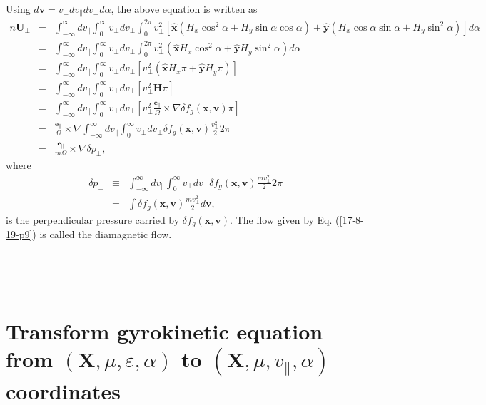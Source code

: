 \documentclass{article}
\begin{document}
Using $d\mathbf{v}= v_{\perp} d v_{\parallel} d v_{\perp} d \alpha$, the above
equation is written as
\begin{eqnarray}
  n\mathbf{U}_{\perp} & = & \int_{- \infty}^{\infty} d v_{\parallel}
  \int_0^{\infty} v_{\perp} d v_{\perp} \int_0^{2 \pi} v_{\perp}^2
  [\hat{\mathbf{x}} (H_x \cos^2 \alpha + H_y \sin \alpha \cos \alpha) +
  \hat{\mathbf{y}} (H_x \cos \alpha \sin \alpha + H_y \sin^2 \alpha)] d \alpha
  \nonumber\\
  & = & \int_{- \infty}^{\infty} d v_{\parallel} \int_0^{\infty} v_{\perp} d
  v_{\perp} \int_0^{2 \pi} v_{\perp}^2 (\hat{\mathbf{x}} H_x \cos^2 \alpha +
  \hat{\mathbf{y}} H_y \sin^2 \alpha) d \alpha \nonumber\\
  & = & \int_{- \infty}^{\infty} d v_{\parallel} \int_0^{\infty} v_{\perp} d
  v_{\perp} [v_{\perp}^2 (\hat{\mathbf{x}} H_x \pi + \hat{\mathbf{y}} H_y
  \pi)] \nonumber\\
  & = & \int_{- \infty}^{\infty} d v_{\parallel} \int_0^{\infty} v_{\perp} d
  v_{\perp} [v_{\perp}^2 \mathbf{H} \pi] \nonumber\\
  & = & \int_{- \infty}^{\infty} d v_{\parallel} \int_0^{\infty} v_{\perp} d
  v_{\perp} [v_{\perp}^2 \frac{\mathbf{e}_{\parallel}}{\Omega} \times \nabla
  \delta f_g (\mathbf{x}, \mathbf{v}) \pi] \nonumber\\
  & = & \frac{\mathbf{e}_{\parallel}}{\Omega} \times \nabla \int_{-
  \infty}^{\infty} d v_{\parallel} \int_0^{\infty} v_{\perp} d v_{\perp}
  \delta f_g (\mathbf{x}, \mathbf{v}) \frac{v_{\perp}^2}{2} 2 \pi \nonumber\\
  & = & \frac{\mathbf{e}_{\parallel}}{m \Omega} \times \nabla \delta
  p_{\perp},  \label{17-8-19-p9}
\end{eqnarray}
where
\begin{eqnarray}
  \delta p_{\perp} & \equiv & \int_{- \infty}^{\infty} d v_{\parallel}
  \int_0^{\infty} v_{\perp} d v_{\perp} \delta f_g (\mathbf{x}, \mathbf{v})
  \frac{m v_{\perp}^2}{2} 2 \pi \nonumber\\
  & = & \int \delta f_g (\mathbf{x}, \mathbf{v}) \frac{m v_{\perp}^2}{2}
  d\mathbf{v}, 
\end{eqnarray}
is the perpendicular pressure carried by $\delta f_g (\mathbf{x},
\mathbf{v})$. The flow given by Eq. (\ref{17-8-19-p9}) is called the
diamagnetic flow.

\

\

\section{Transform gyrokinetic equation from $(\mathbf{X}, \mu, \varepsilon,
\alpha)$ to $(\mathbf{X}, \mu, v_{\parallel}, \alpha)$ coordinates}
\end{document}

